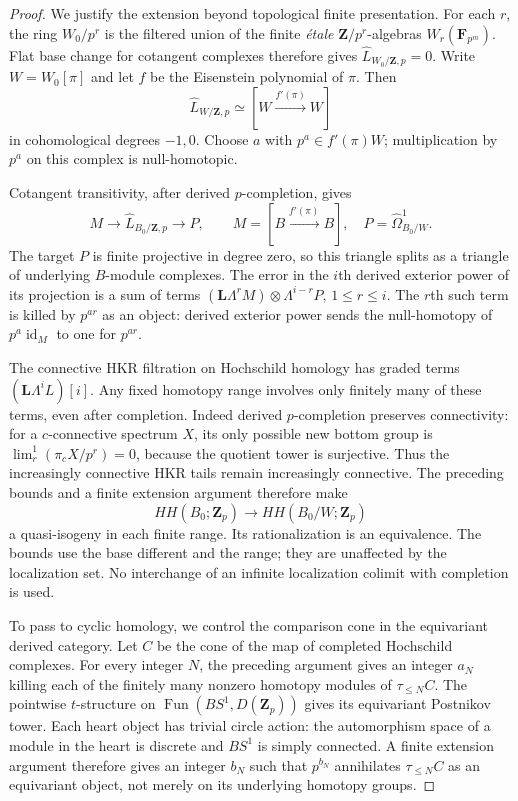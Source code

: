 \documentclass[11pt,a4paper]{amsart}
\numberwithin{equation}{section}
\theoremstyle{definition}
\theoremstyle{remark}
\begin{document}
\begin{proof}
We justify the extension beyond topological finite presentation.
For each $r$, the ring $W_0/p^r$ is the filtered union of the
finite \emph{\'{e}tale} $\mathbf Z/p^r$-algebras
$W_r(\mathbf F_{p^m})$. Flat base change for cotangent complexes
therefore gives $\widehat L_{W_0/\mathbf Z,p}=0$.
Write $W=W_0[\pi]$ and let $f$ be the Eisenstein polynomial of
$\pi$. Then
\[
 \widehat L_{W/\mathbf Z,p}
   \simeq[W\xrightarrow{f'(\pi)}W]
\]
in cohomological degrees $-1,0$. Choose $a$ with
$p^a\in f'(\pi)W$; multiplication by $p^a$ on this complex is
null-homotopic.

Cotangent transitivity, after derived $p$-completion, gives
\[
 M\longrightarrow\widehat L_{B_0/\mathbf Z,p}
       \longrightarrow P,
 \qquad M=[B\xrightarrow{f'(\pi)}B],\quad
 P=\widehat\Omega^1_{B_0/W}.
\]
The target $P$ is finite projective in degree zero, so this
triangle splits as a triangle of underlying $B$-module
complexes. The error in the $i$th derived exterior power of its
projection is a sum of terms
$(\mathbf L\Lambda^rM)\otimes\Lambda^{i-r}P$, $1\le r\le i$.
The $r$th such term is killed by $p^{ar}$ as an object: derived
exterior power sends the null-homotopy of $p^a\operatorname{id}_M$
to one for $p^{ar}$.

The connective HKR filtration on Hochschild homology has graded
terms $(\mathbf L\Lambda^iL)[i]$. Any fixed homotopy range
involves only finitely many of these terms, even after completion.
Indeed derived $p$-completion preserves connectivity: for a
$c$-connective spectrum $X$, its only possible new bottom group
is $\lim^1_r(\pi_cX/p^r)=0$, because the quotient tower is
surjective. Thus the increasingly connective HKR tails remain
increasingly connective. The preceding bounds
and a finite extension argument therefore make
\[
 HH(B_0;\mathbf Z_p)\longrightarrow HH(B_0/W;\mathbf Z_p)
\]
a quasi-isogeny in each finite range. Its rationalization is an
equivalence. The bounds use the base different and the range;
they are unaffected by the localization set. No interchange of
an infinite localization colimit with completion is used.

To pass to cyclic homology, we control the comparison cone in the
equivariant derived category. Let $C$ be the cone of the map of completed Hochschild
complexes. For every integer $N$, the preceding argument gives an
integer $a_N$ killing each of the finitely many nonzero homotopy
modules of $\tau_{\leq N}C$. The pointwise $t$-structure on
$\operatorname{Fun}(BS^1,D(\mathbf Z_p))$ gives its equivariant
Postnikov tower. Each heart object has trivial circle action:
the automorphism space of a module in the heart is discrete and
$BS^1$ is simply connected. A finite extension argument therefore
gives an integer $b_N$ such that $p^{b_N}$ annihilates
$\tau_{\leq N}C$ as an equivariant object, not merely on its
underlying homotopy groups.


\end{proof}
\end{document}
